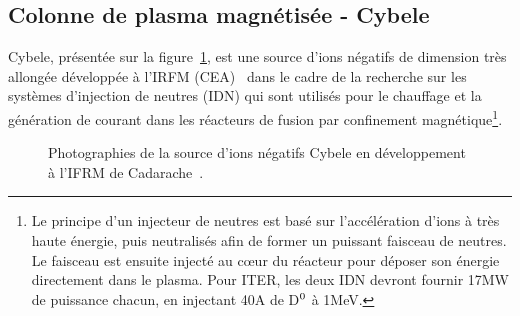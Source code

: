 \begin{refsection}
\section{Colonne de plasma magnétisée - Cybele}
Cybele, présentée sur la figure~\ref{4-cybelePhoto}, est une source d'ions
négatifs de dimension très allongée développée à
l'IRFM (CEA)~\cite{Simonin} dans le cadre de la recherche sur les systèmes
d'injection de neutres (IDN) qui sont utilisés pour le chauffage et la
génération de courant dans les réacteurs de fusion par confinement magnétique\footnote{Le principe d'un
injecteur de neutres est basé sur l'accélération d'ions à très haute énergie,
puis neutralisés afin de former un puissant faisceau de neutres.
Le faisceau est ensuite injecté au c\oe{}ur du réacteur pour déposer son énergie
directement dans le plasma. Pour ITER, les deux IDN devront fournir 17MW de
puissance chacun, en injectant 40A de D$^{{0}}$ à 1MeV.}.
\begin{figure}[!htbp]
  \centering
    \caption{Photographies de la source d'ions négatifs Cybele en développement
    à l'IFRM de Cadarache~\parencite{SimoninHDR}.
    \label{4-cybelePhoto}} 
\end{figure}	


\end{refsection}
